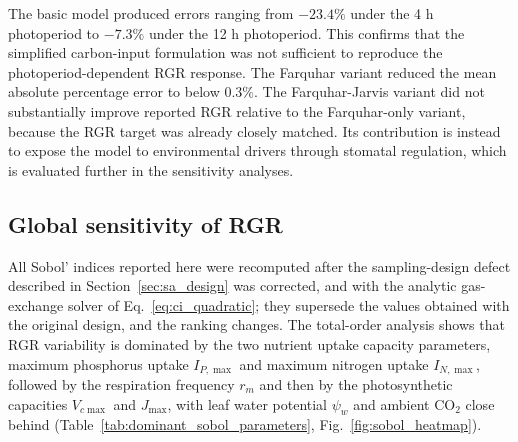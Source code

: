 \documentclass[a4paper,fleqn]{cas-sc}
\begin{document}
The basic model produced errors ranging from $-23.4\%$ under the 4 h
photoperiod to $-7.3\%$ under the 12 h photoperiod. This confirms that the
simplified carbon-input formulation was not sufficient to reproduce the
photoperiod-dependent RGR response. The Farquhar variant reduced the mean
absolute percentage error to below $0.3\%$. The Farquhar-Jarvis variant did
not substantially improve reported RGR relative to the Farquhar-only variant,
because the RGR target was already closely matched. Its contribution is instead
to expose the model to environmental drivers through stomatal regulation, which
is evaluated further in the sensitivity analyses.

\subsection{Global sensitivity of RGR}

All Sobol' indices reported here were recomputed after the sampling-design
defect described in Section~\ref{sec:sa_design} was corrected, and with the
analytic gas-exchange solver of Eq.~\eqref{eq:ci_quadratic}; they supersede
the values obtained with the original design, and the ranking changes. The
total-order analysis shows that RGR variability is dominated by the two
nutrient uptake capacity parameters, maximum phosphorus uptake $I_{P,\max}$
and maximum nitrogen uptake $I_{N,\max}$, followed by the respiration
frequency $r_m$ and then by the photosynthetic capacities $V_{c\max}$ and
$J_{\max}$, with leaf water potential $\psi_w$ and ambient CO$_2$ close
behind (Table~\ref{tab:dominant_sobol_parameters},
Fig.~\ref{fig:sobol_heatmap}).
\end{document}
